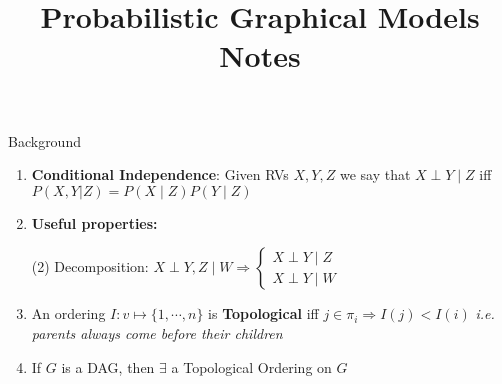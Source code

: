\documentclass[a4paper, columns=2, hidelinks]{cheatsheet}
\title{Probabilistic Graphical Models Notes}
\theoremstyle{mystyle}
\begin{document}
\onecolumn
\setlength{\abovedisplayskip}{0pt}
\setlength{\belowdisplayskip}{0pt}
\setlength{\abovedisplayshortskip}{0pt}
\setlength{\belowdisplayshortskip}{0pt}
\setlength{\jot}{0pt}

\maketitle

\begin{Section}{Background}{}
	\begin{enumerate}[noitemsep, label={}, leftmargin=*]
	\item\textbf{Conditional Independence}: Given RVs $X, Y, Z$ we say that $X 	\perp Y \mid Z$ iff $P(X, Y| Z) = P(X \mid Z)P(Y \mid Z)$
	\item \bfseries  \normalfont Useful properties:
		\begin{tasks}(2)
			\task Decomposition: $X \perp Y,Z \mid W \Rightarrow 
			\begin{cases}
			X \perp Y \mid Z \\
			X \perp Y \mid W
			\end{cases}$
			\task
		\end{tasks}
	\item An ordering \(I: v \mapsto \{1,\cdots,n\}\) is \textbf{Topological} iff \(j \in \pi_i \Rightarrow I(j) < I(i)\) \emph{i.e. parents always come before their children}
	\item If \(G\) is a DAG, then \(\exists\) a Topological Ordering on \(G\)
	\end{enumerate}
\end{Section}
\end{document}

